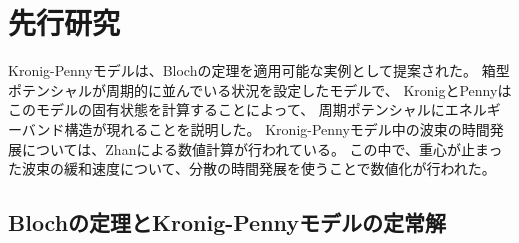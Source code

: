 \documentclass[autodetect-engine,dvipdfmx-if-dvi,ja=standard,a4paper,layout=v2]{bxjsreport}
\begin{document}
    \chapter{先行研究}
    \begin{chapterabstract}
    Kronig-Pennyモデルは、Blochの定理を適用可能な実例として提案された。
    箱型ポテンシャルが周期的に並んでいる状況を設定したモデルで、
    KronigとPennyはこのモデルの固有状態を計算することによって、
    周期ポテンシャルにエネルギーバンド構造が現れることを説明した。
    Kronig-Pennyモデル中の波束の時間発展については、Zhanによる数値計算が行われている。
    この中で、重心が止まった波束の緩和速度について、分散の時間発展を使うことで数値化が行われた。
    \end{chapterabstract}
    \section{Blochの定理とKronig-Pennyモデルの定常解}
\end{document}
